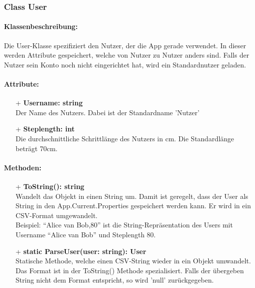 \documentclass[a4paper,12pt]{article}
\begin{document}
\subsubsection{Class User}
	\paragraph{Klassenbeschreibung:}
	Die User-Klasse spezifiziert den Nutzer, der die App gerade verwendet. In dieser werden Attribute gespeichert, welche von Nutzer zu Nutzer anders sind. Falls der Nutzer sein Konto noch nicht eingerichtet hat, wird ein Standardnutzer geladen.\\
	\paragraph{Attribute:}
	\begin{itemize}
		\item[+] \textbf{Username: string}\\Der Name des Nutzers. Dabei ist der Standardname 'Nutzer'\\
		\item[+] \textbf{Steplength: int}\\Die durchschnittliche Schrittlänge des Nutzers in cm. Die Standardlänge beträgt 70cm.\\
	\end{itemize}
	\paragraph{Methoden:}
	\begin{itemize}
		\item[+] \textbf{ToString(): string}\\Wandelt das Objekt in einen String um. Damit ist geregelt, dass der User als String in den App.Current.Properties gespeichert werden kann. Er wird in ein \Gls{CSV}-Format umgewandelt.\\
		Beispiel: ``Alice van Bob,80'' ist die String-Repräsentation des Users mit Username ``Alice van Bob'' und Steplength 80.\\
		\item[+] \textbf{static ParseUser(user: string): User}\\Statische Methode, welche einen \Gls{CSV}-String wieder in  ein Objekt umwandelt. Das Format ist in der ToString() Methode spezialisiert. Falls der übergeben String nicht dem Format entspricht, so wird 'null' zurückgegeben.\\
	\end{itemize}
\end{document}
